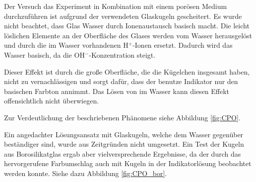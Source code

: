 
Der Versuch das \COT Experiment in Kombination mit einem porösen Medium durchzuführen ist aufgrund der verwendeten Glaskugeln gescheitert. Es wurde nicht beachtet, dass Glas Wasser durch Ionenaustausch basisch macht. Die leicht löslichen Elemente an der Oberfläche des Glases werden vom Wasser herausgelöst und durch die im Wasser vorhandenen H$^+$-Ionen ersetzt. Dadurch wird das Wasser basisch, da die OH$^-$-Konzentration steigt. \citep{Vogel}

Dieser Effekt ist durch die große Oberfläche, die die Kügelchen insgesamt haben, nicht zu vernachlässigen und sorgt dafür, dass der benutze Indikator nur den basischen Farbton annimmt. Das Lösen von \COT im Wasser kann diesen Effekt offensichtlich nicht überwiegen.

Zur Verdeutlichung der beschriebenen Phänomene siehe Abbildung \ref{fig:CPO}.

Ein angedachter Lösungsansatz mit Glaskugeln, welche dem Wasser gegenüber beständiger sind, wurde aus Zeitgründen nicht umgesetzt. Ein Test der Kugeln aus Borosilikatglas ergab aber vielversprechende Ergebnisse, da der durch das \COT hervorgerufene Farbumschlag auch mit Kugeln in der Indikatorlösung beobachtet werden konnte. Siehe dazu Abbildung \ref{fig:CPO_bor}.




  



